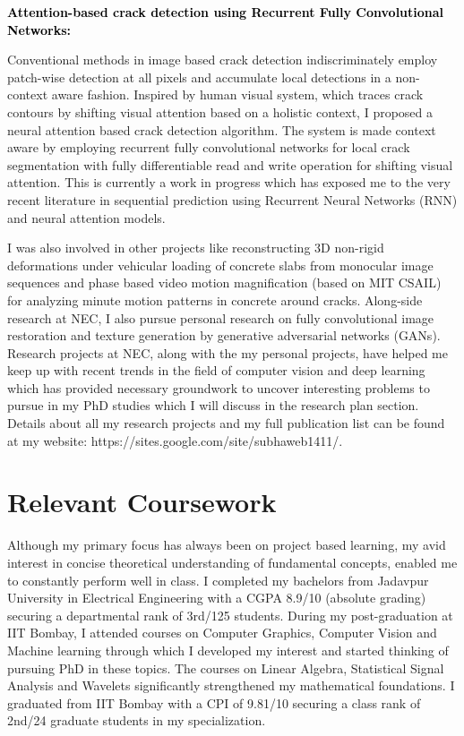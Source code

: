 \documentclass{article}
\newcommand{\statement}[1]{\par\medskip
	{\textcolor{black}{\textbf{#1:}}}\space
}
\begin{document}
	\statement{Attention-based crack detection using Recurrent Fully Convolutional Networks}
	Conventional methods in image based crack detection indiscriminately employ patch-wise detection at all pixels and accumulate local detections in a non-context aware fashion. Inspired by human visual system, which traces crack contours by shifting visual attention based on a holistic context, I proposed a neural attention based crack detection algorithm. The system is made context aware by employing recurrent fully convolutional networks for local crack segmentation with fully differentiable read and write operation for shifting visual attention. This is currently a work in progress which has exposed me to the very recent literature in sequential prediction using Recurrent Neural Networks (RNN) and neural attention models.
	
	\vspace{0.1cm}
	I was also involved in other projects like reconstructing 3D non-rigid deformations under vehicular loading of concrete slabs from monocular image sequences and phase based video motion magnification (based on MIT CSAIL) for analyzing minute motion patterns in concrete around cracks. Along-side research at NEC, I also pursue personal research on fully convolutional image restoration and texture generation by generative adversarial networks (GANs). Research projects at NEC, along with the my personal projects, have helped me keep up with recent trends in the field of computer vision and deep learning which has provided necessary groundwork to uncover interesting problems to pursue in my PhD studies which I will discuss in the research plan section. Details about all my research projects and my full publication list can be found at my website: https://sites.google.com/site/subhaweb1411/.

	\vspace*{-0.25cm}
	\section{Relevant Coursework}
	\vspace*{-0.25cm}
	Although my primary focus has always been on project based learning, my avid interest in concise theoretical understanding of fundamental concepts, enabled me to constantly perform well in class. I completed my bachelors from Jadavpur University in Electrical Engineering with a CGPA 8.9/10 (absolute grading) securing a departmental rank of 3rd/125 students. During my post-graduation at IIT Bombay, I attended courses on Computer Graphics, Computer Vision and Machine learning through which I developed my interest and started thinking of pursuing PhD in these topics. The courses on Linear Algebra, Statistical Signal Analysis and Wavelets significantly strengthened my mathematical foundations. I graduated from IIT Bombay with a CPI of 9.81/10 securing a class rank of 2nd/24 graduate students in my specialization.
	
\end{document}
